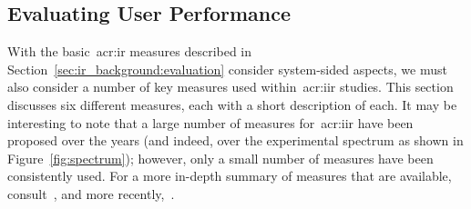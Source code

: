 %
%

\subsection{Evaluating User Performance}\label{sec:ir_background:user:evaluation}
With the basic~\gls{acr:ir} measures described in Section~\ref{sec:ir_background:evaluation} consider system-sided aspects, we must also consider a number of key measures used within~\gls{acr:iir} studies. This section discusses six different measures, each with a short description of each. It may be interesting to note that a large number of measures for~\gls{acr:iir} have been proposed over the years (and indeed, over the experimental spectrum as shown in Figure~\ref{fig:spectrum}); however, only a small number of measures have been consistently used. For a more in-depth summary of measures that are available, consult~\cite{su1992iir_measures}, and more recently,~\cite{kelly2009iir}.

